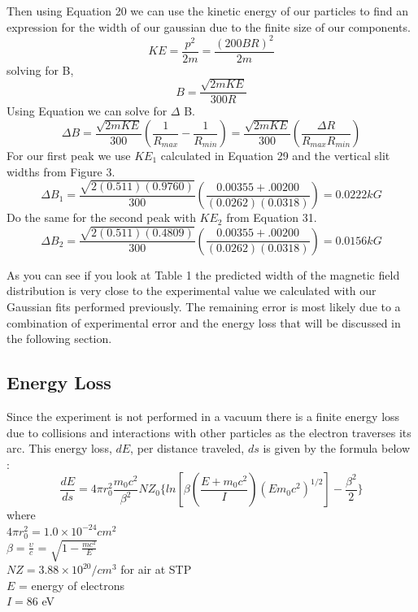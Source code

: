 Then using Equation 20 we can use the kinetic energy of our particles to find an expression for the width of our gaussian due to the finite size of our components. 
\begin{equation}
KE =\frac{ p^{2}}{2m} = \frac{(200BR)^{2}}{2m} 
\end{equation} 
solving for B,
\begin{equation}
B = \frac{\sqrt{2mKE}}{300R}
\end{equation}
Using Equation we can solve for $\Delta$ B.
\begin{equation}
\Delta B = \frac{\sqrt{2mKE}}{300}(\frac{1}{R_{max}}-\frac{1}{R_{min}})= \frac{\sqrt{2mKE}}{300}(\frac{\Delta R}{R_{max}R_{min}})
\end{equation}
For our first peak we use $KE_{1}$ calculated in Equation 29 and the vertical slit widths from Figure 3.
\begin{equation}
\Delta B_{1} = \frac{\sqrt{2(0.511)(0.9760)}}{300}(\frac{0.00355 + .00200}{(0.0262)(0.0318)}) = 0.0222 kG
\end{equation}
Do the same for the second peak with $KE_{2}$ from Equation 31.
\begin{equation}
\Delta B_{2} = \frac{\sqrt{2(0.511)(0.4809)}}{300}(\frac{0.00355 + .00200}{(0.0262)(0.0318)}) = 0.0156 kG
\end{equation}

As you can see if you look at Table 1 the predicted width of the magnetic field distribution is very close to the experimental value we calculated with our Gaussian fits performed previously.  The remaining error is most likely due to a combination of experimental error and the energy loss that will be discussed in the following section. 

\subsection {Energy Loss}
Since the experiment is not performed in a vacuum there is a finite energy loss due to collisions and interactions with other particles as the electron traverses its arc.  This energy loss, $dE$, per distance traveled, $ds$ is given by the formula below \cite{bethe}:
\begin{equation}
\frac{dE}{ds} = 4\pi r^{2}_{0} \frac{m_{0}c^{2}}{\beta^{2}} N Z_{0} \{ ln[\beta (\frac{E+m_{0}c^{2}}{I})({E}{m_{0}c^{2}})^{1/2} ] - \frac{\beta^{2}}{2} \} 
\end{equation} 
where\\
$4\pi r_{0}^{2} = 1.0 \times 10^{-24} cm^{2}$\\
$\beta = \frac{\upsilon}{c}$ = $\sqrt{1-\frac{mc^{2}}{E}}$\\
$NZ = 3.88 \times 10^{20} / cm^{3}$ for air at STP\\
$E$ = energy of electrons\\
$I = 86$ eV\\

